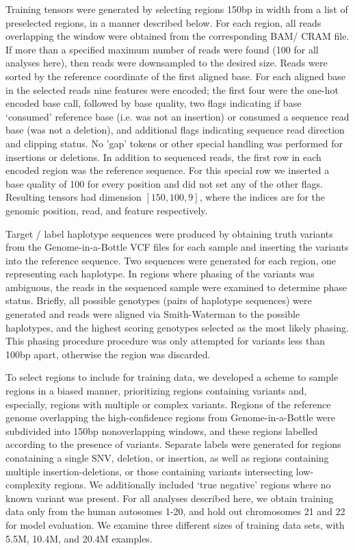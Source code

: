 \documentclass[]{article}
\begin{document}
Training tensors were generated by selecting regions 150bp in width from a list of preselected regions, in a manner described below. For each region, all reads overlapping the window were obtained from the corresponding BAM/ CRAM file. If more than a specified maximum number of reads were found (100 for all analyses here), then reads were downsampled to the desired size.  Reads were sorted by the reference coordinate of the first aligned base. For each aligned base in the selected reads nine features were encoded; the first four were the one-hot encoded base call, followed by base quality, two flags indicating if base `consumed' reference base (i.e. was not an insertion) or consumed a sequence read base (was not a deletion), and additional flags indicating sequence read direction and clipping status.  No 'gap' tokens or other special handling was performed for insertions or deletions. In addition to sequenced reads, the first row in each encoded region was the reference sequence. For this special row we inserted a base quality of 100 for every position and did not set any of the other flags. Resulting tensors had dimension $[150, 100, 9]$, where the indices are for the genomic position, read, and feature respectively.  

Target / label haplotype sequences were produced by obtaining truth variants from the Genome-in-a-Bottle VCF files for each sample and inserting the variants into the reference sequence. Two sequences were generated for each region, one representing each haplotype. In regions where phasing of the variants was ambiguous, the reads in the sequenced sample were examined to determine phase status. Briefly, all possible genotypes (pairs of haplotype sequences) were generated and reads were aligned via Smith-Waterman to the possible haplotypes, and the highest scoring genotypes selected as the most likely phasing. This phasing procedure procedure was only attempted for variants less than 100bp apart, otherwise the region was discarded.

To select regions to include for training data, we developed a scheme to sample regions in a biased manner, prioritizing regions containing variants and, especially, regions with multiple or complex variants. Regions of the reference genome overlapping the high-confidence regions from Genome-in-a-Bottle were subdivided into 150bp nonoverlapping windows, and these regions labelled according to the presence of variants. Separate labels were generated for regions conataining a single SNV, deletion, or insertion, as well as regions containing multiple insertion-deletions, or those containing variants intersecting  low-complexity regions. We additionally included `true negative' regions where no known variant was present.  For all analyses described here, we obtain training data only from the human autosomes 1-20, and hold out chromosomes 21 and 22 for model evaluation.  We examine three different sizes of training data sets, with 5.5M, 10.4M, and 20.4M examples. 
\end{document}

